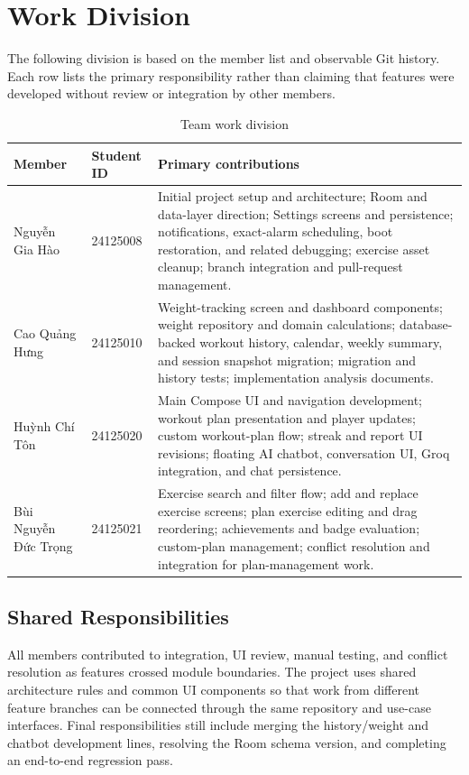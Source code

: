 \section{Work Division}

The following division is based on the member list and observable Git history. Each row lists the primary responsibility rather than claiming that features were developed without review or integration by other members.

\renewcommand{\tablename}{Table}
\begin{table}[ht]
\centering
\caption{Team work division}
\label{tab:work-division}
\begin{tabularx}{\textwidth}{p{} p{} X}
\toprule
\textbf{Member} & \textbf{Student ID} & \textbf{Primary contributions} \\
\midrule
Nguyễn Gia Hào & 24125008 & Initial project setup and architecture; Room and data-layer direction; Settings screens and persistence; notifications, exact-alarm scheduling, boot restoration, and related debugging; exercise asset cleanup; branch integration and pull-request management. \\
Cao Quảng Hưng & 24125010 & Weight-tracking screen and dashboard components; weight repository and domain calculations; database-backed workout history, calendar, weekly summary, and session snapshot migration; migration and history tests; implementation analysis documents. \\
Huỳnh Chí Tôn & 24125020 & Main Compose UI and navigation development; workout plan presentation and player updates; custom workout-plan flow; streak and report UI revisions; floating AI chatbot, conversation UI, Groq integration, and chat persistence. \\
Bùi Nguyễn Đức Trọng & 24125021 & Exercise search and filter flow; add and replace exercise screens; plan exercise editing and drag reordering; achievements and badge evaluation; custom-plan management; conflict resolution and integration for plan-management work. \\
\bottomrule
\end{tabularx}
\end{table}

\subsection{Shared Responsibilities}

All members contributed to integration, UI review, manual testing, and conflict resolution as features crossed module boundaries. The project uses shared architecture rules and common UI components so that work from different feature branches can be connected through the same repository and use-case interfaces. Final responsibilities still include merging the history/weight and chatbot development lines, resolving the Room schema version, and completing an end-to-end regression pass.
